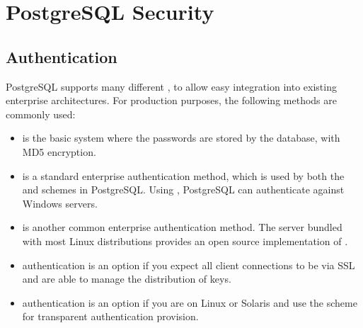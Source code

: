 \documentclass[a4paper,11pt,english]{sphinxmanual}
\begin{document}
\section{PostgreSQL Security}
\label{\detokenize{maintenance:postgresql-security}}\label{\detokenize{maintenance:security}}

\subsection{Authentication}
\label{\detokenize{maintenance:authentication}}
PostgreSQL supports many different , to allow easy integration into existing enterprise architectures. For production purposes, the following methods are commonly used:
\begin{itemize}
\item {} 
 is the basic system where the passwords are stored by the database, with MD5 encryption.

\item {} 
 is a standard enterprise authentication method, which is used by both the  and  schemes in PostgreSQL. Using , PostgreSQL can authenticate against Windows servers.

\item {} 
 is another common enterprise authentication method. The  server bundled with most Linux distributions provides an open source implementation of .

\item {} 
 authentication is an option if you expect all client connections to be via SSL and are able to manage the distribution of keys.

\item {} 
 authentication is an option if you are on Linux or Solaris and use the  scheme for transparent authentication provision.

\end{itemize}
\end{document}
